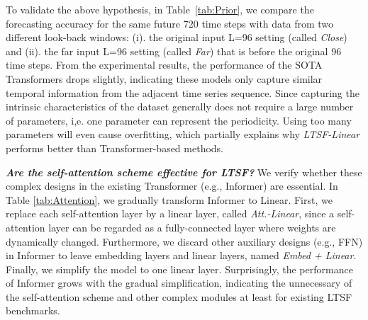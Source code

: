 \documentclass[10pt,twocolumn,letterpaper]{article}
\newcommand{\modelname}{\emph{LTSF-Linear}\xspace}
\begin{document}
To validate the above hypothesis, in Table~\ref{tab:Prior}, we compare the forecasting accuracy for the same future 720 time steps with data from two different look-back windows: (i). the original input L=96 setting (called \emph{Close}) and (ii). the far input L=96 setting (called \emph{Far}) that is before the original 96 time steps. From the experimental results, the performance of the SOTA Transformers drops slightly, indicating these models only capture similar temporal information from the adjacent time series sequence. Since capturing the intrinsic characteristics of the dataset generally does not require a large number of parameters, i,e. one parameter can represent the periodicity. Using too many parameters will even cause overfitting, which partially explains why \modelname performs better than Transformer-based methods. 



\textbf{\emph{Are the self-attention scheme effective for LTSF?}}
We verify whether these complex designs in the existing Transformer (e.g., Informer) are essential. In Table \ref{tab:Attention}, we gradually transform Informer to Linear. First, we replace each self-attention layer by a linear layer, called \emph{Att.-Linear}, since a self-attention layer can be regarded as a fully-connected layer where weights are dynamically changed.
Furthermore, we discard other auxiliary designs (e.g., FFN) in Informer to leave embedding layers and linear layers, named \emph{Embed + Linear}. Finally, we simplify the model to one linear layer. Surprisingly, the performance of Informer grows with the gradual simplification, indicating the unnecessary of the self-attention scheme and other complex modules at least for existing LTSF benchmarks. 
\end{document}
